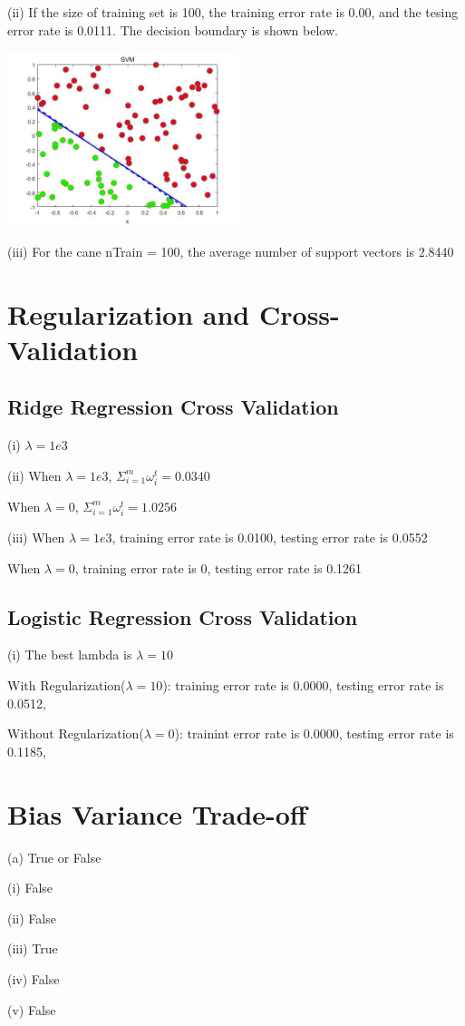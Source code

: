 \documentclass[11pt]{article} %
\begin{document}
(ii) If the size of training set is 100, the training error rate is 0.00, and the tesing error rate is 0.0111. The decision boundary is shown below.

\begin{center}
\includegraphics[height=2in]{./SVM_ii.jpg}
\end{center} 

(iii) For the cane nTrain = 100, the average number of support vectors is 2.8440




\section{Regularization and Cross-Validation}
\subsection{Ridge Regression Cross Validation}

(i) $ \lambda = 1e3$

(ii) When $ \lambda = 1e3 $, $\Sigma_{i=1}^{m} \omega_{i}^{t} = 0.0340$

When $ \lambda = 0 $, $\Sigma_{i=1}^{m} \omega_{i}^{t} = 1.0256$

(iii) When $\lambda=1e3$, training error rate is 0.0100, testing error rate is 0.0552

When $\lambda=0$, training error rate is 0, testing error rate is 0.1261

\subsection{Logistic Regression Cross Validation}

(i) 
The best lambda is $\lambda=10$

With Regularization($\lambda=10$):
training error rate is 0.0000, 
testing error rate is 0.0512,

Without Regularization($\lambda=0$):
trainint error rate is 0.0000,
testing error rate is 0.1185,

\section{Bias Variance Trade-off}
(a) True or False

(i) False

(ii) False

(iii) True

(iv) False

(v) False
\end{document}
